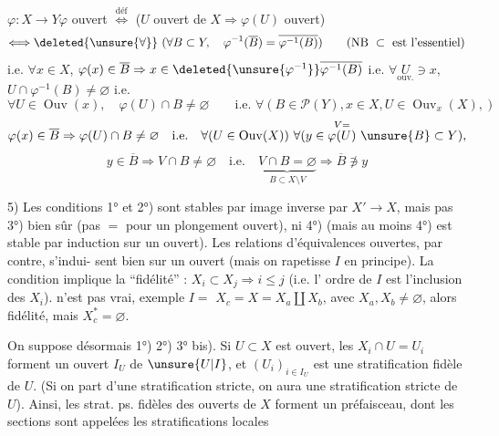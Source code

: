 $\varphi:X\longrightarrow Y$\qquad $\varphi$ ouvert $\overset{\mathrm{déf}}\Longleftrightarrow$ ($U$ ouvert de $X\Rightarrow\varphi(U)$ ouvert)
\[
\Longleftrightarrow\deleted{\unsure{\forall}}\ (\forall B\subset Y,\quad\varphi^{-1}(\overline B)=\overline{\varphi^{-1}(B)})
\qquad(\text{NB }\subset\text{ est l'essentiel})
\]
i.e. $\forall x\in X$, $\varphi(x)\in\overline B\Rightarrow x\in\deleted{\unsure{\varphi^{-1}}}\overline{\varphi^{-1}(B)}$
i.e. $\forall\underset{\mathrm{ouv.}}{U}\ni x$, $U\cap\varphi^{-1}(B)\ne\varnothing$ i.e.
\[
\forall U\in\operatorname{Ouv}(x),\quad\varphi(U)\cap B\ne\varnothing
\qquad\text{i.e. }\forall(B\in\mathcal P(Y),x\in X,U\in\operatorname{Ouv}_x(X),)
\]
\[
\varphi(x)\in\overline B\Rightarrow\varphi(U)\cap B\ne\varnothing\quad\text{i.e.}\quad
\forall(U\in\operatorname{Ouv}(X))\ \forall(y\in\overset{V=}{\varphi(U)}\ \unsure{B}\subset Y),
\]
\[
y\in\overline B\Rightarrow V\cap B\ne\varnothing\quad\text{i.e.}\quad
\underbrace{V\cap B=\varnothing}_{B\subset X\setminus V}\Rightarrow\overline B\not\ni y
\]

5) Les conditions 1° et 2°) sont stables par image inverse
par $X'\longrightarrow X$, mais pas 3°) bien sûr (pas $=$ pour
un plongement ouvert), ni 4°) (mais au moins
4°) est stable par induction sur un ouvert). Les
relations d'équivalences ouvertes, par contre, s'indui-
sent bien sur un ouvert (mais on rapetisse $I$
en principe). 
La condition 
implique la ``fidélité'' : $X_i\subset X_j\Rightarrow i\leq j$ (i.e. l'
ordre de $I$ est l'inclusion des $X_i$). 
n'est pas vrai, exemple $I=$
$X_c=X=X_a\amalg X_b$,  avec $X_a,X_b\ne\varnothing$, alors 
fidélité,  mais $X_c^*=\varnothing$.

On suppose désormais 1°) 2°) 3° bis). Si $U\subset X$
est ouvert, les  $X_i\cap U=U_i$  \inserted{$\ne\varnothing$} forment un
ouvert $I_U$ de $\unsure{U|I}$, et $(U_i)_{i\in I_U}$ est une
stratification fidèle de $U$. (Si on part d'une
stratification stricte, on aura une stratification
stricte de $U$). Ainsi, les strat. ps. fidèles des
ouverts de $X$ forment un préfaisceau, dont les
sections sont appelées les stratifications locales

